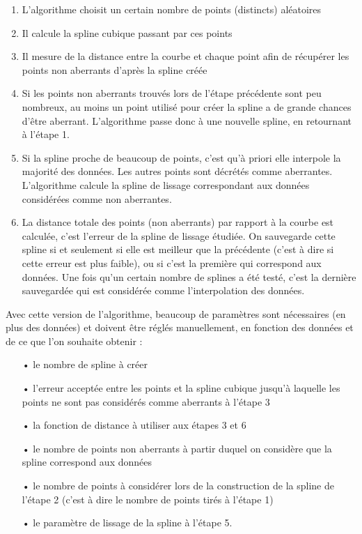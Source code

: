 \documentclass[a4paper,12pt]{article} %
\begin{document}
                    \begin{enumerate}
                    \item
                    L'algorithme choisit un certain nombre de points (distincts) aléatoires
                    \item
                    Il calcule la spline cubique passant par ces points 
                    \item
                    Il mesure de la distance entre la courbe et chaque point afin de récupérer les points non aberrants d'après la spline créée
                    \item
                    Si les points non aberrants trouvés lors de l'étape précédente sont peu nombreux, au moins un point utilisé pour créer la spline a de grande chances d'être aberrant. L'algorithme passe donc à une nouvelle spline, en retournant à l'étape 1.
                    \item
                    Si la spline proche de beaucoup de points, c'est qu'à priori elle interpole la majorité des données. Les autres points sont décrétés comme aberrantes.  L'algorithme calcule la spline de lissage correspondant aux données considérées comme non aberrantes.
                    \item
                    La distance totale des points (non aberrants) par rapport à la courbe est calculée, c'est l'erreur de la spline de lissage étudiée. On sauvegarde cette spline si et seulement si elle est meilleur que la précédente (c'est à dire si cette erreur est plus faible), ou si c'est la première qui correspond aux données.
                    Une fois qu'un certain nombre de splines a été testé, c'est la dernière sauvegardée qui est considérée comme l'interpolation des données.
                    \end{enumerate} 
                    
                    Avec cette version de l'algorithme, beaucoup de paramètres sont nécessaires (en plus des données) et doivent être réglés manuellement, en fonction des données et de ce que l'on souhaite obtenir :
                    \begin{itemize}
                    \item[•] le nombre de spline à créer
                    \item[•]  l'erreur acceptée entre les points et la spline cubique jusqu'à laquelle les points ne sont pas considérés comme aberrants à l'étape 3
                    \item[•]  la fonction de distance à utiliser aux étapes 3 et 6
                    \item[•] le nombre de points non aberrants à partir duquel on considère que la spline correspond aux données
                    \item[•]  le nombre de points à considérer lors de la construction de la spline de l'étape 2 (c'est à dire le nombre de points tirés à l'étape 1)
                    \item[•] le paramètre de lissage de la spline à l'étape 5.
                    \end{itemize}
                    
\end{document}
